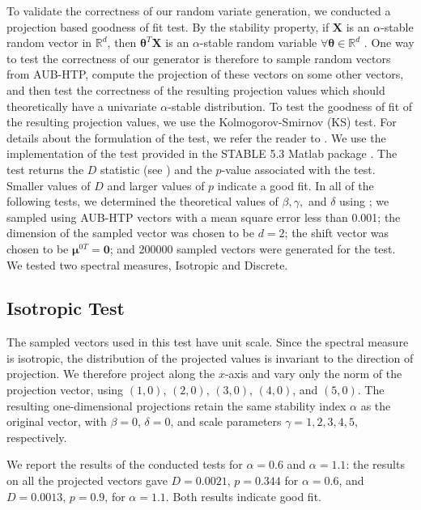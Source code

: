 To validate the correctness of our random variate generation, we conducted a projection based goodness of fit test. By the stability property, if $\mathbf{X}$ is an $\alpha$-stable random vector in $\mathbb{R}^d$, then $\boldsymbol{\theta}^T\mathbf{X}$ is an $\alpha$-stable random variable $\forall \boldsymbol{\theta}\in\mathbb{R}^d$ \cite[Theorem 2.1.2]{SamorodnitskyGennady2000Snrp}. One way to test the correctness of our generator is therefore to sample random vectors from AUB-HTP, compute the projection of these vectors on some other vectors, and then test the correctness of the resulting projection values which should theoretically have a univariate $\alpha$-stable distribution. To test the goodness of fit of the resulting projection values, we use the Kolmogorov-Smirnov (KS) test. For details about the formulation of the test, we refer the reader to \cite[Section 10.6]{degroot2018probability}. We use the implementation of the test provided in the STABLE 5.3 Matlab package \citep{robustanalysis}. The test returns the $D$ statistic (see \cite[equation 10.6.2]{degroot2018probability}) and the $p$-value associated with the test. Smaller values of $D$ and larger values of $p$ indicate a good fit. In all of the following tests, we determined the theoretical values of $\beta,\gamma,$ and $\delta$ using \cite[equation. 2.3.3, equation. 2.3.4,  equation. 2.3.5]{SamorodnitskyGennady2000Snrp}; we sampled using AUB-HTP vectors with a mean square error less than 0.001; the dimension of the sampled vector was chosen to be $d=2$; the shift vector was chosen to be $\boldsymbol{\mu}^{0T}=\mathbf{0}$; and 200000 sampled vectors were generated for the test.  We tested two spectral measures, Isotropic and Discrete.
\subsection{Isotropic Test}
 The sampled vectors used in this test have unit scale. Since the spectral measure is isotropic, the distribution of the projected values is invariant to the direction of projection. We therefore project along the $x$-axis and vary only the norm of the projection vector, using $(1,0)$, $(2,0)$, $(3,0)$, $(4,0)$, and $(5,0)$. The resulting one-dimensional projections retain the same stability index $\alpha$ as the original vector, with $\beta=0$, $\delta=0$, and scale parameters $\gamma=1,2,3,4,5$, respectively.

We report the results of the conducted tests for $\alpha=0.6$ and $\alpha=1.1$: the results on all the projected vectors gave $D=0.0021$, $p=0.344$ for  $\alpha=0.6$, and $D=0.0013$, $p=0.9$, for $\alpha=1.1$. Both results indicate good fit.

